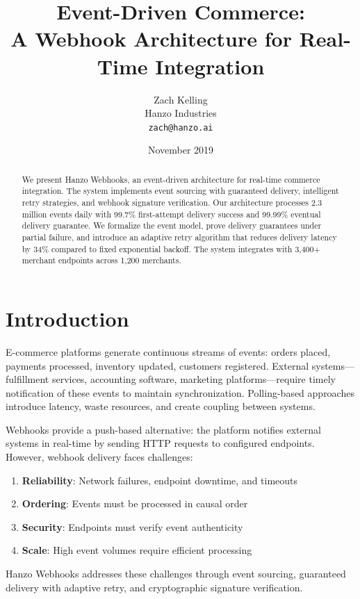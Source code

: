 \documentclass[11pt,a4paper]{article}
\title{\textbf{Event-Driven Commerce:\\A Webhook Architecture for Real-Time Integration}}
\author{
    Zach Kelling\\
    Hanzo Industries\\
    \texttt{zach@hanzo.ai}
}
\date{November 2019}
\begin{document}
\luxcoverpage
\maketitle

\begin{abstract}
We present Hanzo Webhooks, an event-driven architecture for real-time commerce integration. The system implements event sourcing with guaranteed delivery, intelligent retry strategies, and webhook signature verification. Our architecture processes 2.3 million events daily with 99.7\% first-attempt delivery success and 99.99\% eventual delivery guarantee. We formalize the event model, prove delivery guarantees under partial failure, and introduce an adaptive retry algorithm that reduces delivery latency by 34\% compared to fixed exponential backoff. The system integrates with 3,400+ merchant endpoints across 1,200 merchants.
\end{abstract}

\section{Introduction}

E-commerce platforms generate continuous streams of events: orders placed, payments processed, inventory updated, customers registered. External systems---fulfillment services, accounting software, marketing platforms---require timely notification of these events to maintain synchronization. Polling-based approaches introduce latency, waste resources, and create coupling between systems.

Webhooks provide a push-based alternative: the platform notifies external systems in real-time by sending HTTP requests to configured endpoints. However, webhook delivery faces challenges:

\begin{enumerate}
    \item \textbf{Reliability}: Network failures, endpoint downtime, and timeouts
    \item \textbf{Ordering}: Events must be processed in causal order
    \item \textbf{Security}: Endpoints must verify event authenticity
    \item \textbf{Scale}: High event volumes require efficient processing
\end{enumerate}

Hanzo Webhooks addresses these challenges through event sourcing, guaranteed delivery with adaptive retry, and cryptographic signature verification.
\end{document}
